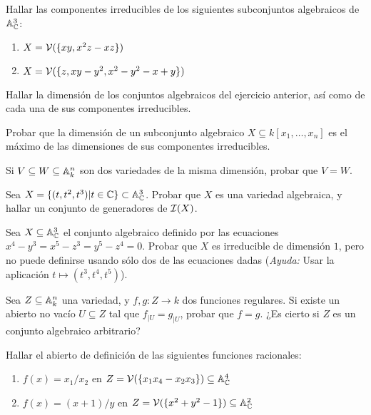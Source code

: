 \documentclass[ACGA.tex]{subfiles}
\begin{document}
\begin{ejer}
 Hallar las componentes irreducibles de los siguientes subconjuntos algebraicos de $\mathbb{A}^3_{\mathbb{C}}$:
\begin{enumerate}
 \item $X=\mathcal{V}(\{xy,x^2z-xz\})$
\item $X=\mathcal{V}(\{z,xy-y^2,x^2-y^2-x+y\})$
\end{enumerate}

\end{ejer}



\begin{ejer}
 Hallar la dimensión de los conjuntos algebraicos del ejercicio anterior, así como de cada una de sus componentes irreducibles.
\end{ejer}


\begin{ejer}
 Probar que la dimensión de un subconjunto algebraico $X\subseteq k[x_1,\ldots,x_n]$ es el máximo de las dimensiones de sus componentes irreducibles.
\end{ejer}

\begin{ejer}
 Si $V\subseteq W\subseteq\mathbb{A}^n_k$ son dos variedades de la misma dimensión, probar que $V=W$.
\end{ejer}

\begin{ejer}
 Sea $X=\{(t,t^2,t^3)|t\in\mathbb{C}\}\subset\mathbb{A}^3_{\mathbb{C}}$. Probar que $X$ es una variedad algebraica, y hallar un conjunto de generadores de $\mathcal{I}(X)$.
\end{ejer}


\begin{ejer}
 Sea $X\subseteq\mathbb{A}^3_{\mathbb{C}}$ el conjunto algebraico definido por las ecuaciones $x^4-y^3=x^5-z^3=y^5-z^4=0$. Probar que $X$ es irreducible de dimensión $1$, pero no puede definirse usando sólo dos de las ecuaciones dadas (\emph{Ayuda:} Usar la aplicación $t\mapsto(t^3,t^4,t^5)$).
\end{ejer}


\begin{ejer}\label{extensionfuncion}
 Sea $Z\subseteq\mathbb{A}^n_k$ una variedad, y $f,g:Z\to k$ dos funciones regulares. Si existe un abierto no vacío $U\subseteq Z$ tal que $f_{|U}=g_{|U}$, probar que $f=g$. ¿Es cierto si $Z$ es un conjunto algebraico arbitrario?
\end{ejer}

\begin{ejer}
 Hallar el abierto de definición de las siguientes funciones racionales:
\begin{enumerate}
 \item $f(x)=x_1/x_2$ en $Z=\mathcal{V}(\{x_1x_4-x_2x_3\})\subseteq\mathbb{A}^4_{\mathbb{C}}$
\item $f(x)=(x+1)/y$ en $Z=\mathcal{V}(\{x^2+y^2-1\})\subseteq\mathbb{A}^2_{\mathbb{C}}$
\end{enumerate}

\end{ejer}
\end{document}
